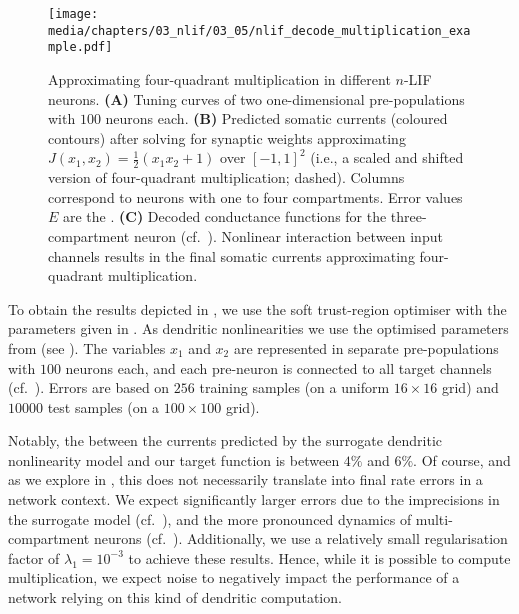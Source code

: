 \begin{figure}
	\centering
	\texttt{[image: media/chapters/03\_nlif/03\_05/nlif\_decode\_multiplication\_example.pdf]}\\[0.25em]
	{\label{fig:nlif_decode_multiplication_example_a}}%
	{\label{fig:nlif_decode_multiplication_example_b}}%
	{\label{fig:nlif_decode_multiplication_example_c}}
	\caption[Approximating four-quadrant multiplication in different $n$-LIF neurons]{
	Approximating four-quadrant multiplication in different $n$-LIF neurons.
	\textbf{(A)} Tuning curves of two one-dimensional pre-populations with $100$ neurons each.
	\textbf{(B)} Predicted somatic currents (coloured contours) after solving for synaptic weights approximating $J(x_1, x_2) = \frac{1}2 (x_1 x_2 + 1)$ over $[-1, 1]^2$ (i.e., a scaled and shifted version of four-quadrant multiplication; dashed).
	Columns correspond to \nlif neurons with one to four compartments.
	Error values $E$ are the \NRMSE.
	\textbf{(C)} Decoded conductance functions for the three-compartment neuron (cf.~). Nonlinear interaction between input channels results in the final somatic currents approximating four-quadrant multiplication.
	}
	\label{fig:nlif_decode_multiplication_example}
\end{figure}

To obtain the results depicted in , we use the soft trust-region optimiser with the parameters given in .
As dendritic nonlinearities we use the optimised parameters from  (see ).
The variables $x_1$ and $x_2$ are represented in separate pre-populations with $100$ neurons each, and each pre-neuron is connected to all target channels (cf.~).
Errors are based on $256$ training samples (on a uniform $16 \times 16$ grid) and $\num{10000}$ test samples (on a $100 \times 100$ grid).

Notably, the \NRMSE between the currents predicted by the surrogate dendritic nonlinearity model and our target function is between $4\%$ and $6\%$.
Of course, and as we explore in , this does not necessarily translate into final rate errors in a network context.
We expect significantly larger errors due to the imprecisions in the surrogate model (cf.~), and the more pronounced dynamics of multi-compartment neurons (cf.~).
Additionally, we use a relatively small regularisation factor of $\lambda_1 = 10^{-3}$ to achieve these results.
Hence, while it is possible to compute multiplication, we expect noise to negatively impact the performance of a network relying on this kind of dendritic computation.

